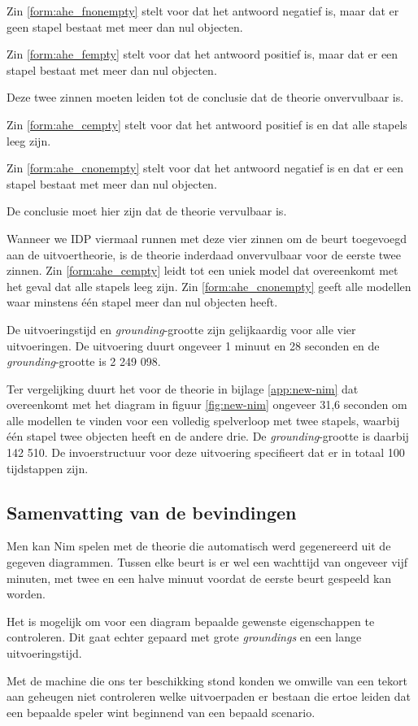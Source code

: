 Zin \ref{form:ahe_fnonempty} stelt voor dat het antwoord negatief is, maar dat er geen stapel bestaat met meer dan nul objecten.

Zin \ref{form:ahe_fempty} stelt voor dat het antwoord positief is, maar dat er een stapel bestaat met meer dan nul objecten.

Deze twee zinnen moeten leiden tot de conclusie dat de theorie onvervulbaar is.

Zin \ref{form:ahe_cempty} stelt voor dat het antwoord positief is en dat alle stapels leeg zijn.

Zin \ref{form:ahe_cnonempty} stelt voor dat het antwoord negatief is en dat er een stapel bestaat met meer dan nul objecten.

De conclusie moet hier zijn dat de theorie vervulbaar is.

Wanneer we IDP viermaal runnen met deze vier zinnen om de beurt toegevoegd aan de uitvoertheorie, is de theorie inderdaad onvervulbaar voor de eerste twee zinnen. Zin \ref{form:ahe_cempty} leidt tot een uniek model dat overeenkomt met het geval dat alle stapels leeg zijn. Zin \ref{form:ahe_cnonempty} geeft alle modellen waar minstens \'e\'en stapel meer dan nul objecten heeft.

De uitvoeringstijd en \textit{grounding}-grootte zijn gelijkaardig voor alle vier uitvoeringen. De uitvoering duurt ongeveer 1 minuut en 28 seconden en de \textit{grounding}-grootte is 2 249 098.

Ter vergelijking duurt het voor de theorie in bijlage \ref{app:new-nim} dat overeenkomt met het diagram in figuur \ref{fig:new-nim} ongeveer 31,6 seconden om alle modellen te vinden voor een volledig spelverloop met twee stapels, waarbij \'e\'en stapel twee objecten heeft en de andere drie. De \textit{grounding}-grootte is daarbij 142 510. De invoerstructuur voor deze uitvoering specifieert dat er in totaal 100 tijdstappen zijn.

\subsection{Samenvatting van de bevindingen}
Men kan Nim spelen met de theorie die automatisch werd gegenereerd uit de gegeven diagrammen. Tussen elke beurt is er wel een wachttijd van ongeveer vijf minuten, met twee en een halve minuut voordat de eerste beurt gespeeld kan worden.

Het is mogelijk om voor een diagram bepaalde gewenste eigenschappen te controleren. Dit gaat echter gepaard met grote \textit{groundings} en een lange uitvoeringstijd.

Met de machine die ons ter beschikking stond konden we omwille van een tekort aan geheugen niet controleren welke uitvoerpaden er bestaan die ertoe leiden dat een bepaalde speler wint beginnend van een bepaald scenario.